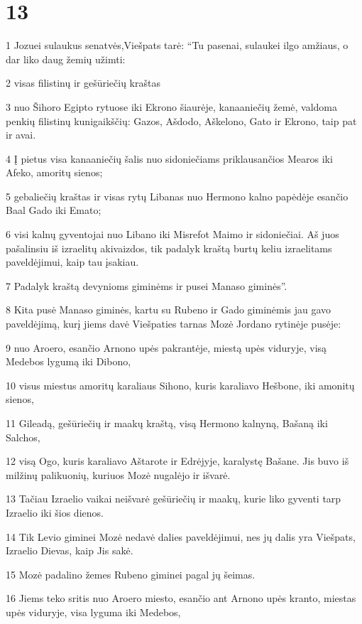 \chapter{13}

\par 1 Jozuei sulaukus senatvės,Viešpats tarė: “Tu pasenai, sulaukei ilgo amžiaus, o dar liko daug žemių užimti: 
\par 2 visas filistinų ir gešūriečių kraštas 
\par 3 nuo Šihoro Egipto rytuose iki Ekrono šiaurėje, kanaaniečių žemė, valdoma penkių filistinų kunigaikščių: Gazos, Ašdodo, Aškelono, Gato ir Ekrono, taip pat ir avai. 
\par 4 Į pietus visa kanaaniečių šalis nuo sidoniečiams priklausančios Mearos iki Afeko, amoritų sienos; 
\par 5 gebaliečių kraštas ir visas rytų Libanas nuo Hermono kalno papėdėje esančio Baal Gado iki Emato; 
\par 6 visi kalnų gyventojai nuo Libano iki Misrefot Maimo ir sidoniečiai. Aš juos pašalinsiu iš izraelitų akivaizdos, tik padalyk kraštą burtų keliu izraelitams paveldėjimui, kaip tau įsakiau. 
\par 7 Padalyk kraštą devynioms giminėms ir pusei Manaso giminės”. 
\par 8 Kita pusė Manaso giminės, kartu su Rubeno ir Gado giminėmis jau gavo paveldėjimą, kurį jiems davė Viešpaties tarnas Mozė Jordano rytinėje pusėje: 
\par 9 nuo Aroero, esančio Arnono upės pakrantėje, miestą upės viduryje, visą Medebos lygumą iki Dibono, 
\par 10 visus miestus amoritų karaliaus Sihono, kuris karaliavo Hešbone, iki amonitų sienos, 
\par 11 Gileadą, gešūriečių ir maakų kraštą, visą Hermono kalnyną, Bašaną iki Salchos, 
\par 12 visą Ogo, kuris karaliavo Aštarote ir Edrėjyje, karalystę Bašane. Jis buvo iš milžinų palikuonių, kuriuos Mozė nugalėjo ir išvarė. 
\par 13 Tačiau Izraelio vaikai neišvarė gešūriečių ir maakų, kurie liko gyventi tarp Izraelio iki šios dienos. 
\par 14 Tik Levio giminei Mozė nedavė dalies paveldėjimui, nes jų dalis yra Viešpats, Izraelio Dievas, kaip Jis sakė. 
\par 15 Mozė padalino žemes Rubeno giminei pagal jų šeimas. 
\par 16 Jiems teko sritis nuo Aroero miesto, esančio ant Arnono upės kranto, miestas upės viduryje, visa lyguma iki Medebos, 
